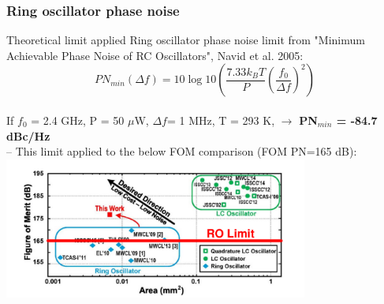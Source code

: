 \documentclass[t, screen, aspectratio=43]{beamer}
\begin{document}
\begin{frame}
	\frametitle{Ring oscillator phase noise}
	\begin{block}{Theoretical limit applied}
		\scriptsize
		Ring oscillator phase noise limit from "Minimum Achievable Phase Noise of RC Oscillators", Navid et al. 2005:
		\begin{equation}
			PN_{min}(\Delta f)= 10\log 10\left(\frac{7.33k_BT}{P}\left(\frac{f_0}{\Delta f}\right)^2\right)
		\end{equation}
		\vspace{-.8em}\\
		If $f_0$ = 2.4 GHz, P = 50 $\mu$W, $\Delta f$= 1 MHz, T = 293 K, $\rightarrow$ \textbf{PN$_{min}$ = -84.7 dBc/Hz} \\
		-- This limit applied to the below FOM comparison (FOM PN=165 dB):
		\vspace{-1.5em}
		\center\includegraphics[width=0.75\textwidth, angle=0]{ro_perf.pdf}
	\end{block}
\end{frame}
\end{document}
